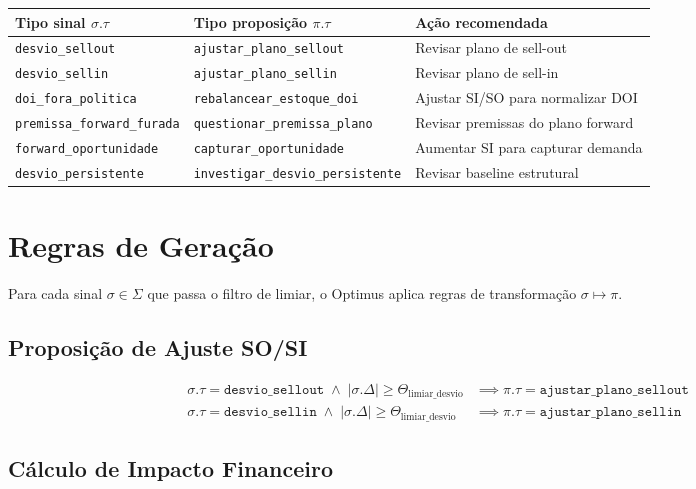 \documentclass[a4paper, 12pt]{report}
\theoremstyle{definition}
\theoremstyle{remark}
\begin{document}
\begin{center}
\begin{tabular}{llp{5.5cm}}
  \toprule
  \textbf{Tipo sinal $\sigma.\tau$} & \textbf{Tipo proposi\c{c}\~ao $\pi.\tau$} & \textbf{A\c{c}\~ao recomendada} \\
  \midrule
  \texttt{desvio\_sellout} & \texttt{ajustar\_plano\_sellout} & Revisar plano de sell-out \\
  \texttt{desvio\_sellin} & \texttt{ajustar\_plano\_sellin} & Revisar plano de sell-in \\
  \texttt{doi\_fora\_politica} & \texttt{rebalancear\_estoque\_doi} & Ajustar SI/SO para normalizar DOI \\
  \texttt{premissa\_forward\_furada} & \texttt{questionar\_premissa\_plano} & Revisar premissas do plano forward \\
  \texttt{forward\_oportunidade} & \texttt{capturar\_oportunidade} & Aumentar SI para capturar demanda \\
  \texttt{desvio\_persistente} & \texttt{investigar\_desvio\_persistente} & Revisar baseline estrutural \\
  \bottomrule
\end{tabular}
\end{center}


\section{Regras de Gera\c{c}\~ao}

Para cada sinal $\sigma \in \Sigma$ que passa o filtro de limiar,
o Optimus aplica regras de transforma\c{c}\~ao $\sigma \mapsto \pi$.

\subsection{Proposi\c{c}\~ao de Ajuste SO/SI}

\begin{align}
  \sigma.\tau = \texttt{desvio\_sellout} \;\wedge\;
  |\sigma.\Delta| \geq \Theta_{\text{limiar\_desvio}} &\implies
  \pi.\tau = \texttt{ajustar\_plano\_sellout} \\
  \sigma.\tau = \texttt{desvio\_sellin} \;\wedge\;
  |\sigma.\Delta| \geq \Theta_{\text{limiar\_desvio}} &\implies
  \pi.\tau = \texttt{ajustar\_plano\_sellin}
\end{align}


\subsection{C\'alculo de Impacto Financeiro}
\end{document}
